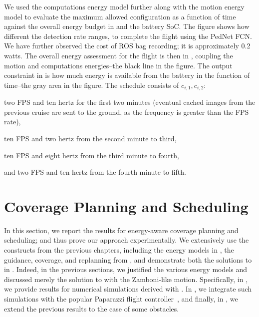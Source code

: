 We used the computations energy model further along with the motion energy model to evaluate the maximum allowed configuration as a function of time against the overall energy budget in  and the battery SoC. The figure shows how different the detection rate ranges, to complete the flight using the PedNet FCN. We have further observed the cost of ROS bag recording; it is approximately 0.2 watts.
The overall energy assessment for the flight is then in , coupling the motion and computations energies--the black line in the figure. The output constraint in  is how much energy is available from the battery in the function of time--the gray area in the figure. The schedule consists of $c_{i,1},c_{i,2}$: 
\begin{enumerate*}[label={(\alph*)},font={\textit}]
  \item two FPS and ten hertz for the first two minutes (eventual cached images from the previous cruise are sent to the ground, as the frequency is greater than the FPS rate),
  \item ten FPS and two hertz from the second minute to third,
  \item ten FPS and eight hertz from the third minute to fourth, 
  \item and two FPS and ten hertz from the fourth minute to fifth.
\end{enumerate*}


\section{Coverage Planning and Scheduling}
\label{sec:res-dyn}

In this section, we report the results for energy-aware coverage planning and scheduling; and thus prove our approach experimentally. We extensively use the constructs from the previous chapters, including the energy models in , the guidance, coverage, and replanning from , and demonstrate both the solutions to  in . Indeed, in the previous sections, we justified the various energy models and discussed merely the solution to  with the Zamboni-like motion. Specifically, in , we provide results for numerical simulations derived with \matlab. In , we integrate such simulations with the popular Paparazzi flight controller~\citep{papa}, and finally, in , we extend the previous results to the case of some obstacles.

